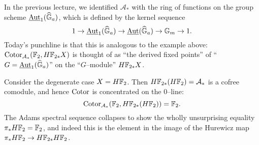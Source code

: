 \begin{example}\label{HF2HomologyIsValuedInAutGaEquivarModules}
In the previous lecture, we identified $\mathcal A_*$ with the ring of functions on the group scheme $\operatorname{\underline{\smash{\operatorname{Aut}}}}_1(\widehat{\mathbb G}_a)$, which is defined by the kernel sequence \[1 \to \operatorname{\underline{\smash{\operatorname{Aut}}}}_1(\widehat{\mathbb G}_a) \to \operatorname{\underline{\smash{\operatorname{Aut}}}}(\widehat{\mathbb G}_a) \to \mathbb G_m \to 1.\]  Today's punchline is that this is analogous to the example above: $\operatorname{Cotor}_{\mathcal A_*}(\mathbb F_2, H\mathbb F_{2*} X)$ is thought of as ``the derived fixed points'' of ``$G = \operatorname{\underline{\smash{\operatorname{Aut}}}}_1(\widehat{\mathbb G}_a)$'' on the ``$G$--module'' $H\mathbb F_{2*} X$.
\end{example}

\begin{example}
Consider the degenerate case $X = H\mathbb F_2$.  Then $H\mathbb F_{2*}(H\mathbb F_2) = \mathcal A_*$ is a cofree comodule, and hence $\operatorname{Cotor}$ is concentrated on the $0$--line: \[\operatorname{Cotor}_{\mathcal A_*}(\mathbb F_2, H\mathbb F_{2*}(H\mathbb F_2)) = \mathbb F_2.\]  The Adams spectral sequence collapses to show the wholly unsurprising equality $\pi_* H\mathbb F_2 = \mathbb F_2$, and indeed this is the element in the image of the Hurewicz map $\pi_* H\mathbb F_2 \to H\mathbb F_{2*} H\mathbb F_2$.
\end{example}

